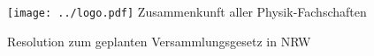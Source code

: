 \documentclass[DIV=calc]{scrartcl}
\begin{document}
\hspace{0.87\textwidth}
\begin{minipage}{120pt}
	\vspace{-1.8cm}
	\texttt{[image: ../logo.pdf]}
	\centering
	\small Zusammenkunft aller Physik-Fachschaften
\end{minipage}

\begin{center}
  \huge{Resolution zum geplanten Versammlungsgesetz in NRW}\vspace{.25\baselineskip}\\
  \normalsize
\end{center}
\vspace{1cm}




\end{document}
